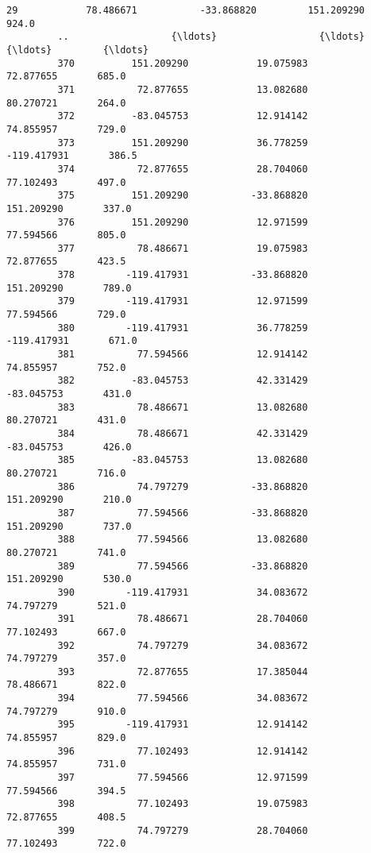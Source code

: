 \documentclass[11pt]{article}
\begin{document}
\begin{Verbatim}[commandchars=\\\{\}]
         29            78.486671           -33.868820         151.209290       924.0   
         ..                  {\ldots}                  {\ldots}                {\ldots}         {\ldots}   
         370          151.209290            19.075983          72.877655       685.0   
         371           72.877655            13.082680          80.270721       264.0   
         372          -83.045753            12.914142          74.855957       729.0   
         373          151.209290            36.778259        -119.417931       386.5   
         374           72.877655            28.704060          77.102493       497.0   
         375          151.209290           -33.868820         151.209290       337.0   
         376          151.209290            12.971599          77.594566       805.0   
         377           78.486671            19.075983          72.877655       423.5   
         378         -119.417931           -33.868820         151.209290       789.0   
         379         -119.417931            12.971599          77.594566       729.0   
         380         -119.417931            36.778259        -119.417931       671.0   
         381           77.594566            12.914142          74.855957       752.0   
         382          -83.045753            42.331429         -83.045753       431.0   
         383           78.486671            13.082680          80.270721       431.0   
         384           78.486671            42.331429         -83.045753       426.0   
         385          -83.045753            13.082680          80.270721       716.0   
         386           74.797279           -33.868820         151.209290       210.0   
         387           77.594566           -33.868820         151.209290       737.0   
         388           77.594566            13.082680          80.270721       741.0   
         389           77.594566           -33.868820         151.209290       530.0   
         390         -119.417931            34.083672          74.797279       521.0   
         391           78.486671            28.704060          77.102493       667.0   
         392           74.797279            34.083672          74.797279       357.0   
         393           72.877655            17.385044          78.486671       822.0   
         394           77.594566            34.083672          74.797279       910.0   
         395         -119.417931            12.914142          74.855957       829.0   
         396           77.102493            12.914142          74.855957       731.0   
         397           77.594566            12.971599          77.594566       394.5   
         398           77.102493            19.075983          72.877655       408.5   
         399           74.797279            28.704060          77.102493       722.0   
         

\end{Verbatim}
\end{document}
